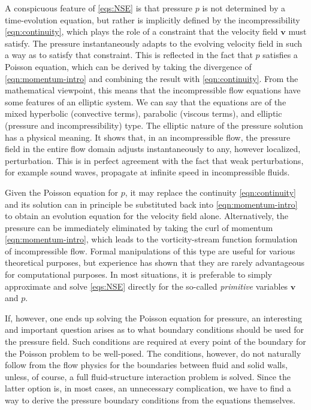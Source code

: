 \documentclass{article}
\numberwithin{equation}{section}
\begin{document}
A conspicuous feature of \cref{eqs:NSE} is that pressure $p$ is not determined by a time-evolution equation, but rather is implicitly defined by the incompressibility \cref{eqn:continuity}, which plays the role of a constraint that the velocity field $\boldsymbol{v}$ must satisfy. The pressure instantaneously adapts to the evolving velocity field in such a way as to satisfy that constraint. This is reflected in the fact that $p$ satisfies a Poisson equation, which can be derived by taking the divergence of \cref{eqn:momentum-intro} and combining the result with \cref{eqn:continuity}. From the mathematical viewpoint, this means that the incompressible flow equations have some features of an elliptic system. We can say that the equations are of the mixed hyperbolic (convective terms), parabolic (viscous terms), and elliptic (pressure and incompressibility) type. The elliptic nature of the pressure solution has a physical meaning. It shows that, in an incompressible flow, the pressure field in the entire flow domain adjusts instantaneously to any, however localized, perturbation. This is in perfect agreement with the fact that weak perturbations, for example sound waves, propagate at infinite speed in incompressible fluids.

Given the Poisson equation for $p$, it may replace the continuity \cref{eqn:continuity} and its solution can in principle be substituted back into \cref{eqn:momentum-intro} to obtain an evolution equation for the velocity field alone. Alternatively, the pressure can be immediately eliminated by taking the $\mathrm{curl}$ of momentum \cref{eqn:momentum-intro}, which leads to the vorticity-stream function formulation of incompressible flow. Formal manipulations of this type are useful for various theoretical purposes, but experience has shown that they are rarely advantageous for computational purposes. In most situations, it is preferable to simply approximate and solve \cref{eqs:NSE} directly for the so-called \textit{primitive} variables $\boldsymbol{v}$ and $p$.

If, however, one ends up solving the Poisson equation for pressure, an interesting and important question arises as to what boundary conditions should be used for the pressure field. Such conditions are required at every point of the boundary for the Poisson problem to be well-posed. The conditions, however, do not naturally follow from the flow physics for the boundaries between fluid and solid walls, unless, of course, a full fluid-structure interaction problem is solved. Since the latter option is, in most cases, an unnecessary complication, we have to find a way to derive the pressure boundary conditions from the equations themselves.
\end{document}
